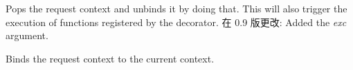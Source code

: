 \documentclass[a4paper,12pt]{sphinxmanual}
\begin{document}
\begin{fulllineitems}
\begin{fulllineitems}
\end{fulllineitems}


\begin{fulllineitems}
\label{api:flask.ctx.RequestContext.pop}
Pops the request context and unbinds it by doing that.  This will
also trigger the execution of functions registered by the
{\hyperref[api:flask.Flask.teardown_request]{}} decorator.
在 0.9 版更改: Added the \emph{exc} argument.
\end{fulllineitems}


\begin{fulllineitems}
\label{api:flask.ctx.RequestContext.push}
Binds the request context to the current context.

\end{fulllineitems}


\end{fulllineitems}

\end{document}
